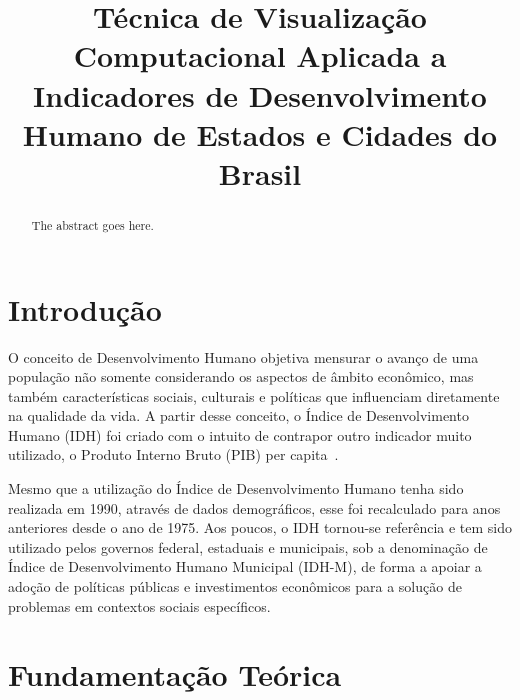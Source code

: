 \documentclass[conference]{IEEEtran}
\begin{document}
\title{Técnica de Visualização Computacional Aplicada a Indicadores de Desenvolvimento Humano de Estados e Cidades do Brasil}


\author{
}



\maketitle

\begin{abstract}
The abstract goes here.
\end{abstract}


\IEEEpeerreviewmaketitle



\section{Introdução}
O conceito de Desenvolvimento Humano objetiva mensurar o avanço de uma população não somente considerando os aspectos de âmbito econômico, mas também características sociais, culturais e políticas que influenciam diretamente na qualidade da vida. A partir desse conceito, o Índice de Desenvolvimento Humano (IDH) foi criado com o intuito de contrapor outro indicador muito utilizado, o Produto Interno Bruto (PIB) per capita~\cite{atlas}.



Mesmo que a utilização do Índice de Desenvolvimento Humano tenha sido realizada em 1990, através de dados demográficos, esse foi recalculado para anos anteriores desde o ano de 1975. Aos poucos, o IDH tornou-se referência e tem sido utilizado pelos governos federal, estaduais e municipais, sob a denominação de Índice de Desenvolvimento Humano Municipal (IDH-M), de forma a apoiar a adoção de políticas públicas e investimentos econômicos para a solução de problemas em contextos sociais específicos.

\section{Fundamentação Teórica}
\end{document}
